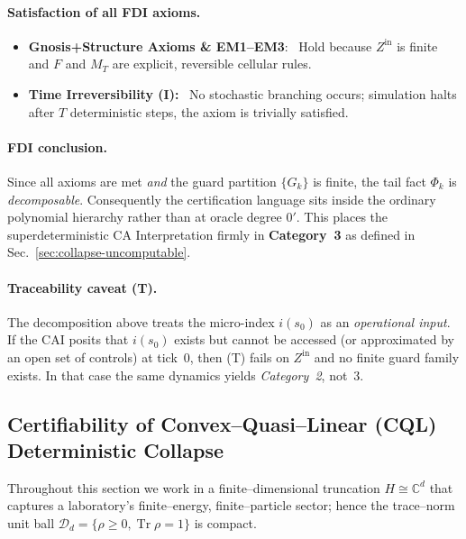 \documentclass[12pt]{article}
\theoremstyle{definition}
\theoremstyle{plain}
\begin{document}
\paragraph{Satisfaction of all FDI axioms.}
\begin{itemize}[leftmargin=12pt,itemsep=1pt]
  \item \textbf{Gnosis+Structure Axioms \& EM1–EM3}: \
        Hold because $Z^{\mathrm{in}}$ is finite and $F$ and $M_T$ are
        explicit, reversible cellular rules.
  \item \textbf{Time Irreversibility (I):} \
        No stochastic branching occurs; simulation halts after $T$
        deterministic steps, the axiom is trivially satisfied.
\end{itemize}

\paragraph{FDI conclusion.}
Since all axioms are met \emph{and} the guard partition
$\{G_k\}$ is finite, the tail fact $\Phi_k$ is
\emph{decomposable}.  Consequently the certification language sits
inside the ordinary polynomial hierarchy rather than at oracle degree
$0'$.  This places the superdeterministic CA Interpretation firmly in
\textbf{Category~3} as defined in Sec.~\ref{sec:collapse-uncomputable}.
\paragraph{Traceability caveat (T).}
The decomposition above treats the micro-index $i(s_0)$ as an \emph{operational input}. If the CAI posits that $i(s_0)$ exists but cannot be accessed (or approximated by an open set of controls) at tick~0, then (T) fails on $Z^{\mathrm{in}}$ and no finite guard family exists. In that case the same dynamics yields \emph{Category~2}, not~3.


\subsection{Certifiability of Convex–Quasi–Linear (CQL) Deterministic
         Collapse}
\label{sec:cql-cert}

Throughout this section we work in a finite–dimensional truncation
\(H\!\cong\!\mathbb{C}^{d}\) that captures a laboratory’s
finite–energy, finite–particle sector; hence the trace–norm unit ball
\(\mathcal{D}_d\!=\!\{\rho\ge0,\operatorname{Tr}\rho=1\}\) is compact.
\end{document}
